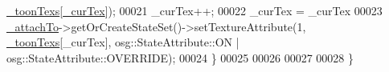 \begin{DoxyCode}
      \hyperlink{classbrtr_1_1_toon_tex_switcher_callback_a96cbd2a83f9ed21efde9d086c34e6d5e}{\_toonTexs}[\hyperlink{classbrtr_1_1_toon_tex_switcher_callback_a58030dcd246f0f2c168965ca087cfa17}{\_curTex}]);
00021         \_curTex++;
00022         \_curTex = \_curTex %
00023         \hyperlink{classbrtr_1_1_base_interaction_callback_a6666bae9f8f89ebbf75637c922ebfb54}{\_attachTo}->getOrCreateStateSet()->setTextureAttribute(1, 
      \hyperlink{classbrtr_1_1_toon_tex_switcher_callback_a96cbd2a83f9ed21efde9d086c34e6d5e}{\_toonTexs}[\_curTex], osg::StateAttribute::ON | osg::StateAttribute::OVERRIDE);
00024     \}
00025 
00026 
00027 
00028 \}
\end{DoxyCode}
